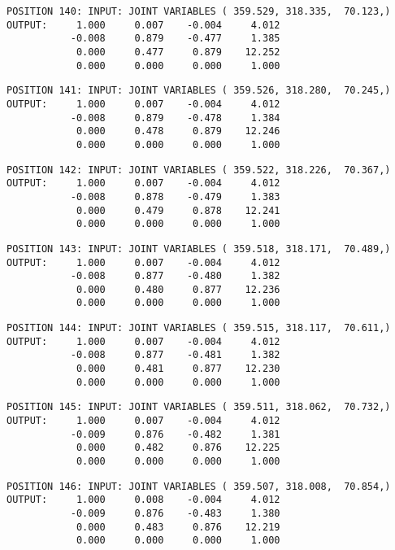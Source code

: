 \begin{verbatim}
POSITION 140: INPUT: JOINT VARIABLES ( 359.529, 318.335,  70.123,)
OUTPUT:     1.000     0.007    -0.004     4.012
           -0.008     0.879    -0.477     1.385
            0.000     0.477     0.879    12.252
            0.000     0.000     0.000     1.000
\end{verbatim} \pagebreak[1]\begin{verbatim}
POSITION 141: INPUT: JOINT VARIABLES ( 359.526, 318.280,  70.245,)
OUTPUT:     1.000     0.007    -0.004     4.012
           -0.008     0.879    -0.478     1.384
            0.000     0.478     0.879    12.246
            0.000     0.000     0.000     1.000
\end{verbatim} \pagebreak[1]\begin{verbatim}
POSITION 142: INPUT: JOINT VARIABLES ( 359.522, 318.226,  70.367,)
OUTPUT:     1.000     0.007    -0.004     4.012
           -0.008     0.878    -0.479     1.383
            0.000     0.479     0.878    12.241
            0.000     0.000     0.000     1.000
\end{verbatim} \pagebreak[1]\begin{verbatim}
POSITION 143: INPUT: JOINT VARIABLES ( 359.518, 318.171,  70.489,)
OUTPUT:     1.000     0.007    -0.004     4.012
           -0.008     0.877    -0.480     1.382
            0.000     0.480     0.877    12.236
            0.000     0.000     0.000     1.000
\end{verbatim} \pagebreak[1]\begin{verbatim}
POSITION 144: INPUT: JOINT VARIABLES ( 359.515, 318.117,  70.611,)
OUTPUT:     1.000     0.007    -0.004     4.012
           -0.008     0.877    -0.481     1.382
            0.000     0.481     0.877    12.230
            0.000     0.000     0.000     1.000
\end{verbatim} \pagebreak[1]\begin{verbatim}
POSITION 145: INPUT: JOINT VARIABLES ( 359.511, 318.062,  70.732,)
OUTPUT:     1.000     0.007    -0.004     4.012
           -0.009     0.876    -0.482     1.381
            0.000     0.482     0.876    12.225
            0.000     0.000     0.000     1.000
\end{verbatim} \pagebreak[1]\begin{verbatim}
POSITION 146: INPUT: JOINT VARIABLES ( 359.507, 318.008,  70.854,)
OUTPUT:     1.000     0.008    -0.004     4.012
           -0.009     0.876    -0.483     1.380
            0.000     0.483     0.876    12.219
            0.000     0.000     0.000     1.000
\end{verbatim} \pagebreak[1]\begin{verbatim}

\end{verbatim}
